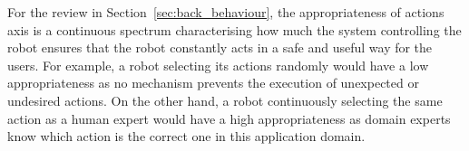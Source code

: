     
    
    For the review in Section~\ref{sec:back_behaviour}, the appropriateness of actions axis is a continuous spectrum characterising how much the system controlling the robot ensures that the robot constantly acts in a safe and useful way for the users. For example, a robot selecting its actions randomly would have a low appropriateness as no mechanism prevents the execution of unexpected or undesired actions. On the other hand, a robot continuously selecting the same action as a human expert would have a high appropriateness as domain experts know which action is the correct one in this application domain.


